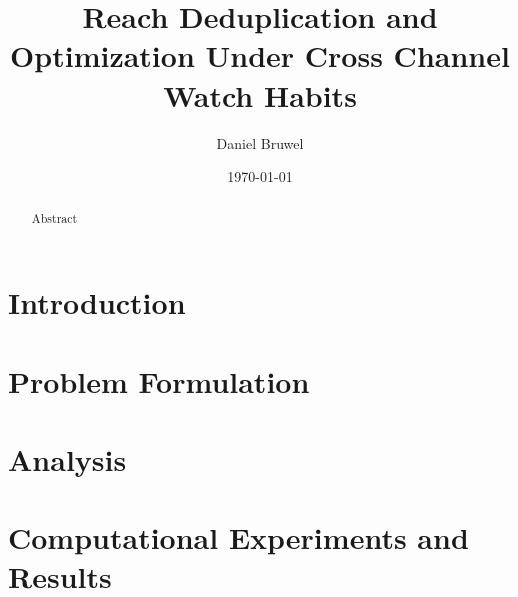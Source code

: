 \documentclass[11pt]{article}
\title{Reach Deduplication and Optimization Under Cross Channel Watch Habits}
\author{Daniel Bruwel}
\date{\today}
\begin{document}
\maketitle

\begin{abstract}
Abstract
\end{abstract}

\section{Introduction}
\cite{chvatal1979greedy}

\section{Problem Formulation}

\section{Analysis}

\section{Computational Experiments and Results}




\end{document}
